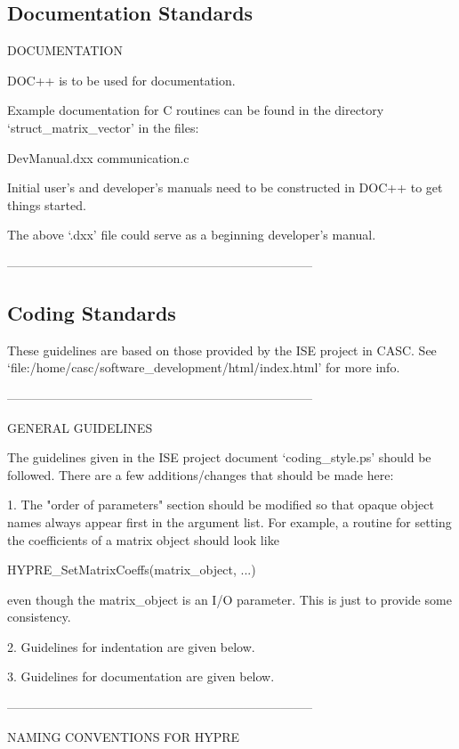 \subsection{Documentation Standards}

DOCUMENTATION

  DOC++ is to be used for documentation.

  Example documentation for C routines can be found in the directory
  `struct_matrix_vector' in the files:

     DevManual.dxx
     communication.c

  Initial user's and developer's manuals need to be constructed in
  DOC++ to get things started.

  The above `.dxx' file could serve as a beginning developer's manual.

--------------------------------------------------------------------------



\subsection{Coding Standards}
These guidelines are based on those provided by the ISE project in CASC.
See `file:/home/casc/software_development/html/index.html' for more info.

--------------------------------------------------------------------------

GENERAL GUIDELINES

The guidelines given in the ISE project document `coding_style.ps'
should be followed.  There are a few additions/changes that should
be made here:

  1. The "order of parameters" section should be modified so that
  opaque object names always appear first in the argument list.
  For example, a routine for setting the coefficients of a matrix
  object should look like

     HYPRE_SetMatrixCoeffs(matrix_object, ...)

  even though the matrix_object is an I/O parameter.  This is
  just to provide some consistency.

  2. Guidelines for indentation are given below.

  3. Guidelines for documentation are given below.

--------------------------------------------------------------------------

NAMING CONVENTIONS FOR HYPRE


